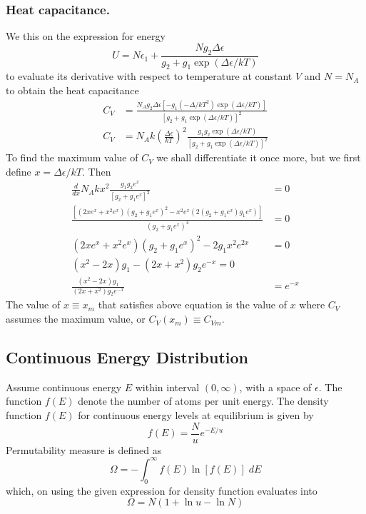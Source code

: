 \documentclass[../../../Main.tex]{subfiles}
\begin{document}
\subsubsection{Heat capacitance.} We this on the expression for energy 
\begin{equation*}
    U=N\epsilon_1+\frac{Ng_2\Delta\epsilon}{g_2+g_1\exp(\Delta\epsilon/kT)}
\end{equation*}
to evaluate its derivative with respect to temperature at constant $V$ and $N=N_A$ to obtain the heat capacitance
\begin{align*}
    C_V&=\frac{N_Ag_2\Delta\epsilon\left[-g_1(-\Delta/kT^2)\exp (\Delta \epsilon/kT) \right]}{\left[g_2+g_1\exp(\Delta\epsilon/kT)\right]^2}\\
    C_V&=N_Ak\left(\frac{\Delta\epsilon}{kT}\right)^2\frac{g_1g_2\exp(\Delta\epsilon/kT)}{\left[g_2+g_1\exp(\Delta\epsilon/kT)\right]^2}
\end{align*}
To find the maximum value of $C_V$ we shall differentiate it once more, but we first define $x=\Delta\epsilon/kT$. Then 
\begin{align*}
    \frac{d}{dx}N_Akx^2\frac{g_1g_2e^x}{\left[g_2+g_1e^x\right]^2}&=0\\
    \frac{\left[(2xe^x+x^2e^x)(g_2+g_1e^x)^2-x^2e^x(2(g_2+g_1e^x)g_1e^x)\right]}{(g_2+g_1e^x)^4}&=0\\
    (2xe^x+x^2e^x)(g_2+g_1e^x)^2-2g_1x^2e^{2x}&=0\\
    (x^2-2x)g_1-(2x+x^2)g_2e^{-x}=0\\
   \frac{(x^2-2x)g_1}{(2x+x^2)g_2e^{-x}} &=e^{-x}
\end{align*}
The value of $x\equiv x_m$ that satisfies above equation is the value of $x$ where $C_V$ assumes the maximum value, or $C_V(x_m)\equiv C_{Vm}$.

\subsection{Continuous Energy Distribution}
Assume continuous energy $E$ within interval $(0,\infty)$, with a space of $\epsilon$. The function $f(E)$ denote the number of atoms per unit energy. The density function $f(E) $ for continuous energy levels at equilibrium is given by
\begin{equation*}
    f(E)=\frac{N}{u}e^{-E/u}
\end{equation*}
Permutability measure is defined as 
\begin{equation*}
    \Omega=-\int_{0}^{\infty}f(E)\ln\left[f(E)\right]\;dE
\end{equation*}
which, on using the given expression for density function evaluates into 
\begin{equation*}
    \Omega=N(1+\ln u-\ln N)
\end{equation*}
\end{document}
